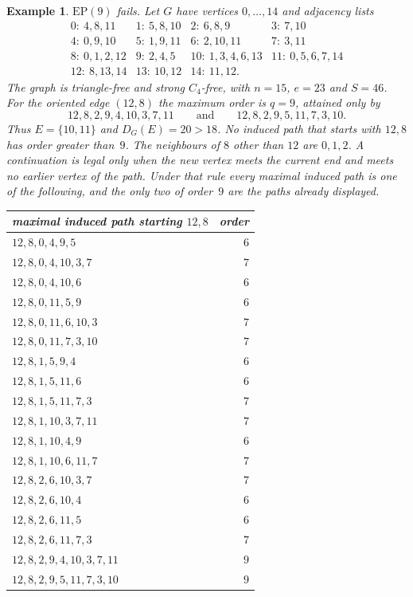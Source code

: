 \documentclass[ASNA]{USG}
\theoremstyle{WBstyletwo}
\newtheorem{example}[theorem]{Example}
\numberwithin{equation}{section}
\begin{document}
\begin{example}\label{ex:ep}
$\mathrm{EP}(9)$ fails. Let $G$ have vertices $0,\dots,14$ and adjacency lists
\[
\begin{array}{llll}
0{:}\ 4,8,11 & 1{:}\ 5,8,10 & 2{:}\ 6,8,9 & 3{:}\ 7,10\\
4{:}\ 0,9,10 & 5{:}\ 1,9,11 & 6{:}\ 2,10,11 & 7{:}\ 3,11\\
8{:}\ 0,1,2,12 & 9{:}\ 2,4,5 & 10{:}\ 1,3,4,6,13 & 11{:}\ 0,5,6,7,14\\
12{:}\ 8,13,14 & 13{:}\ 10,12 & 14{:}\ 11,12. &
\end{array}
\]
The graph is triangle-free and strong $C_4$-free, with $n=15$, $e=23$ and $S=46$. For the oriented edge $(12,8)$ the maximum order is $q=9$, attained only by
\[
12,8,2,9,4,10,3,7,11\qquad\text{and}\qquad 12,8,2,9,5,11,7,3,10.
\]
Thus $E=\{10,11\}$ and $D_G(E)=20>18$. No induced path that starts with $12,8$ has order greater than~$9$. The neighbours of $8$ other than $12$ are $0,1,2$. A continuation is legal only when the new vertex meets the current end and meets no earlier vertex of the path. Under that rule every maximal induced path is one of the following, and the only two of order~$9$ are the paths already displayed.

\begin{center}
\small
\begin{tabular}{@{}lr@{}}
\toprule
maximal induced path starting $12,8$ & order\\
\midrule
$12,8,0,4,9,5$ & $6$\\
$12,8,0,4,10,3,7$ & $7$\\
$12,8,0,4,10,6$ & $6$\\
$12,8,0,11,5,9$ & $6$\\
$12,8,0,11,6,10,3$ & $7$\\
$12,8,0,11,7,3,10$ & $7$\\
$12,8,1,5,9,4$ & $6$\\
$12,8,1,5,11,6$ & $6$\\
$12,8,1,5,11,7,3$ & $7$\\
$12,8,1,10,3,7,11$ & $7$\\
$12,8,1,10,4,9$ & $6$\\
$12,8,1,10,6,11,7$ & $7$\\
$12,8,2,6,10,3,7$ & $7$\\
$12,8,2,6,10,4$ & $6$\\
$12,8,2,6,11,5$ & $6$\\
$12,8,2,6,11,7,3$ & $7$\\
$12,8,2,9,4,10,3,7,11$ & $9$\\
$12,8,2,9,5,11,7,3,10$ & $9$\\
\bottomrule
\end{tabular}
\end{center}


\end{example}
\end{document}
